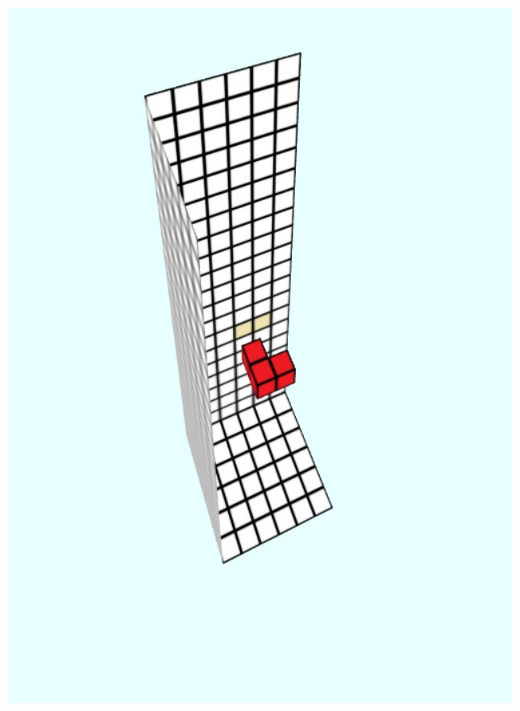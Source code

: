 \documentclass[12pt]{article}
\begin{document}
\begin{small}
\begin{center}
\includegraphics[scale=0.4]{m4}

\end{center}
\end{small}
\end{document}
